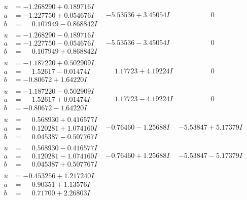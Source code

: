 \documentclass[1p]{elsarticle_modified}
\theoremstyle{definition}
\begin{document}
$$\begin{array}{c|c|c}
\begin{aligned}
u &= -1.268290 + 0.189716 I \\
a &= -1.227750 + 0.054676 I \\
b &= \phantom{-}0.107949 - 0.868842 I\end{aligned}
 & -5.53536 + 3.45054 I & \phantom{-0.000000 } 0 \\ \hline\begin{aligned}
u &= -1.268290 - 0.189716 I \\
a &= -1.227750 - 0.054676 I \\
b &= \phantom{-}0.107949 + 0.868842 I\end{aligned}
 & -5.53536 - 3.45054 I & \phantom{-0.000000 } 0 \\ \hline\begin{aligned}
u &= -1.187220 + 0.502909 I \\
a &= \phantom{-}1.52617 - 0.01474 I \\
b &= -0.80672 + 1.64220 I\end{aligned}
 & \phantom{-}1.17723 + 4.19224 I & \phantom{-0.000000 } 0 \\ \hline\begin{aligned}
u &= -1.187220 - 0.502909 I \\
a &= \phantom{-}1.52617 + 0.01474 I \\
b &= -0.80672 - 1.64220 I\end{aligned}
 & \phantom{-}1.17723 - 4.19224 I & \phantom{-0.000000 } 0 \\ \hline\begin{aligned}
u &= \phantom{-}0.568930 + 0.416577 I \\
a &= \phantom{-}0.120281 + 1.074160 I \\
b &= \phantom{-}0.045387 - 0.507767 I\end{aligned}
 & -0.76460 - 1.25688 I & -5.53847 + 5.17379 I \\ \hline\begin{aligned}
u &= \phantom{-}0.568930 - 0.416577 I \\
a &= \phantom{-}0.120281 - 1.074160 I \\
b &= \phantom{-}0.045387 + 0.507767 I\end{aligned}
 & -0.76460 + 1.25688 I & -5.53847 - 5.17379 I \\ \hline\begin{aligned}
u &= -0.453256 + 1.217240 I \\
a &= \phantom{-}0.90351 + 1.13576 I \\
b &= \phantom{-}0.71700 + 2.26803 I\end{aligned}

\end{array}$$
\end{document}
